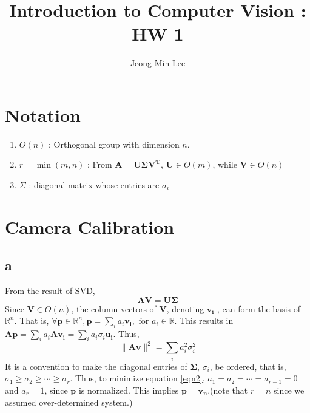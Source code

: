 \documentclass[10pt]{article}
\title{\textbf{Introduction to Computer Vision : HW 1}}
\author{Jeong Min Lee}
\begin{document}
\maketitle
\section*{Notation}
\begin{enumerate}
    \item $O(n)$ : Orthogonal group with dimension $n$.
    \item $r = \min (m,n)$ : From $\mathbf{A = U\Sigma V^T}$, $\mathbf{U} \in O(m)$, while $\mathbf{V} \in O(n)$
    \item $\Sigma$ : diagonal matrix whose entries are $\sigma_i$
\end{enumerate}
\section{Camera Calibration}
\subsection*{a}
From the result of SVD, 
\begin{equation}
    \mathbf{AV=U\Sigma}
\end{equation}
Since $\mathbf{V} \in O(n)$, the column vectors of $\mathbf{V}$, denoting $\mathbf{v_i}$ , can form the basis of $\mathbb{R}^n$. That is, $\forall \mathbf{p} \in \mathbb{R}^n, \mathbf{p} = \sum_i a_i \mathbf{v_i},\text{ for } a_i \in \mathbb{R}$.
This results in $\mathbf{Ap} =\sum_i a_i \mathbf{Av_i} = \sum_i a_i\sigma_i \mathbf{u_i}$. Thus,
\begin{equation}
    \lVert \mathbf{Av}\rVert^2 = \sum_i a_i^2\sigma_i^2
    \label{eqn2}
\end{equation}
It is a convention to make the diagonal entries of $\mathbf{\Sigma}$, $\sigma_i$, be ordered, that is, $\sigma_1 \ge \sigma_2 \ge \cdots \ge \sigma_r$.
Thus, to minimize equation \ref{eqn2}, $a_1 = a_2 = \cdots = a_{r-1} = 0$ and $a_r = 1$, since $\mathbf{p}$ is normalized. This implies $\mathbf{p = v_n}$.(note that $r = n$ since we assumed over-determined system.)
\end{document}
